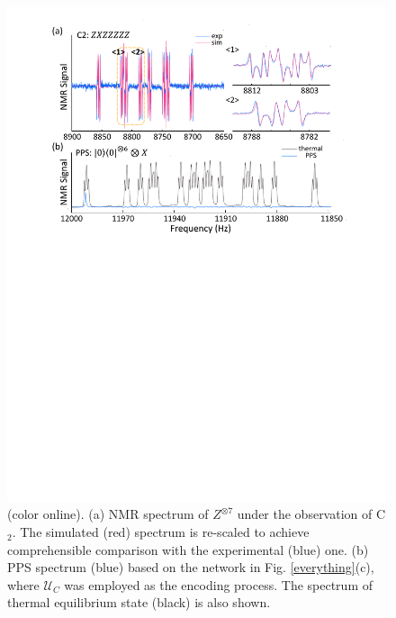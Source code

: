 \documentclass[prl,twocolumn,showpacs]{revtex4-1}
\begin{document}
\begin{figure}[htb]
\begin{center}
\includegraphics[width=\columnwidth]{spectra.pdf}
\end{center}
\setlength{\abovecaptionskip}{-0.35cm}
\caption{\footnotesize{(color online). (a) NMR spectrum of $Z^{\otimes 7}$ under the observation of C$_2$. The simulated (red) spectrum is re-scaled to achieve comprehensible comparison with the experimental (blue) one. (b) PPS spectrum (blue) based on the network in Fig. \ref{everything}(c), where $\mathcal{U}_{C}$ was employed as the encoding process. The spectrum of thermal equilibrium state (black) is also shown.}}\label{spectra}
\end{figure}
\end{document}
